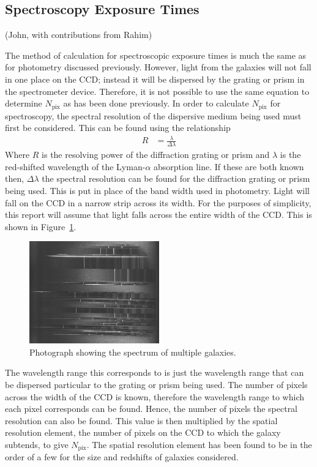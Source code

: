 \subsection{Spectroscopy Exposure Times} %
\label{sub:calculation_of_exposure_times}
(John, with contributions from Rahim)

	The method of calculation for spectroscopic exposure times is much the same as for photometry discussed previously. However, light from the galaxies will not fall in one place on the CCD; instead it will be dispersed by the grating or prism in the spectrometer device. Therefore, it is not possible to use the same equation to determine $N_\text{pix}$ as has been done previously. In order to calculate $N_\text{pix}$ for spectroscopy, the spectral resolution of the dispersive medium being used must first be considered. This can be found using the relationship
	\begin{align}
		R &= \frac{\lambda}{\Delta\lambda}
	\end{align}
	Where $R$ is the resolving power of the diffraction grating or prism and $\lambda$ is the red-shifted wavelength of the Lyman-$\alpha$ absorption line. If these are both known then, $\Delta\lambda$ the spectral resolution can be found for the diffraction grating or prism being used. This is put in place of the band width used in photometry. Light will fall on the CCD in a narrow strip across its width. For the purposes of simplicity, this report will assume that light falls across the entire width of the CCD. This is shown in Figure~\ref{fig:multi_object_spectrum}.
	\begin{figure}[htbp]
		\centering
		\includegraphics[width=0.5\textwidth]{../Images/Multi_Object_spectrum_picture.png}
		\caption{Photograph showing the spectrum of multiple galaxies.\label{fig:multi_object_spectrum}}
	\end{figure}

	The wavelength range this corresponds to is just the wavelength range that can be dispersed particular to the grating or prism being used. The number of pixels across the width of the CCD is known, therefore the wavelength range to which each pixel corresponds can be found. Hence, the number of pixels the spectral resolution can also be found. This value is then multiplied by the spatial resolution element, the number of pixels on the CCD to which the galaxy subtends, to give $N_\text{pix}$. The spatial resolution element has been found to be in the order of a few for the size and redshifts of galaxies considered\cite{SpatialRes}.

